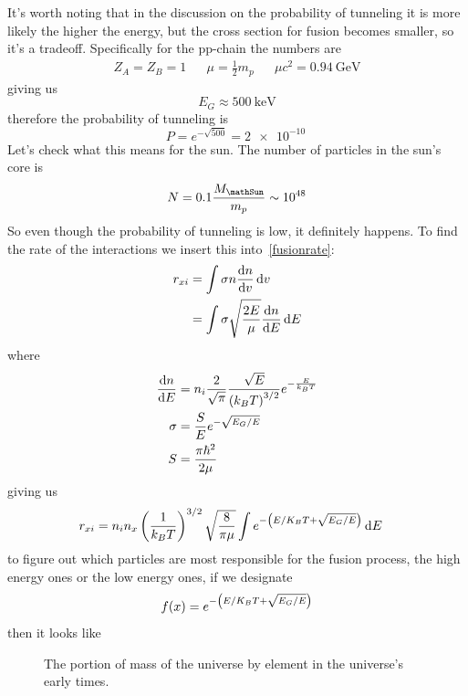 It's worth noting that in the discussion on the probability of tunneling it is more likely the higher the energy, but the cross section for fusion becomes smaller, so it's a tradeoff. Specifically for the pp-chain the numbers are
\begin{align}
	Z_A=Z_B=1 && \mu = \frac{1}{2}m_p && \mu c^2 = \SI{0.94}{\giga\electronvolt}
\end{align}
giving us 
\begin{equation}
	E_G \approx \SI{500}{\kilo\electronvolt}
\end{equation}
therefore the probability of tunneling is
\begin{equation}
	P=e^{-\sqrt{500}} = \SI{2e-10}{}
\end{equation}
Let's check what this means for the sun. The number of particles in the sun's core is
\begin{equation}
	N = 0.1 \frac{M_\mathSun}{m_p} \sim \SI{e48}{}
\end{equation}
So even though the probability of tunneling is low, it definitely happens. To find the rate of the interactions we insert this into~\ref{fusionrate}:
\begin{align}
	r_{xi} &= \int\sigma n \diff{n}{v}\dd v\\
	&= \int \sigma \sqrt{\frac{2E}{\mu}}\diff{n}{E} \dd E\\
\end{align}
where
\begin{align}
	\diff{n}{E} &= n_i\frac{2}{\sqrt{\pi}}\frac{\sqrt{E}}{\ins{k_B T}^{3/2}}e^{-\frac{E}{k_B T}}\\
	\sigma &= \frac{S}{E}e^{-\sqrt{E_G/E}}\\
	S &= \frac{\pi \hbar^2}{2\mu}
\end{align}
giving us
\begin{align}\label{rate_int}
	r_{xi} &= n_i n_x\left(\frac{1}{k_B T}\right)^{3/2}\sqrt{\frac{8}{\pi\mu}}\int e^{-\left(E/K_B T+\sqrt{E_G/E}\right)} \mathop{}\!\mathrm{d} E
\end{align}
to figure out which particles are most responsible for the fusion process, the high energy ones or the low energy ones, if we designate
\begin{equation}
	f(x) = e^{-\left(E/K_B T+\sqrt{E_G/E}\right)} 
\end{equation}
then it looks like
\begin{figure}[!htb]
	\centering
	\caption{The portion of mass of the universe by element in the universe's early times.}
\end{figure}
